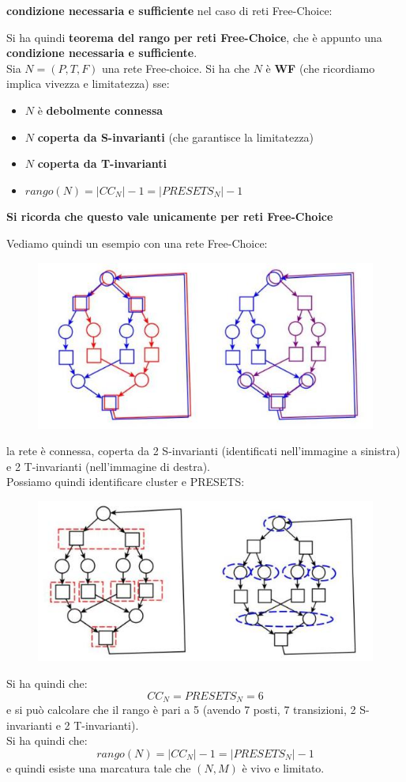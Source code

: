 \documentclass[a4paper,12pt, oneside]{book}
\begin{document}
\textbf{condizione necessaria e sufficiente} nel caso di reti Free-Choice:
\begin{teorema}
  Si ha quindi \textbf{teorema del rango per reti Free-Choice}, che è appunto
  una \textbf{condizione necessaria e sufficiente}.\\
  Sia $N = (P, T , F )$ una rete Free-choice. Si ha che $N$ è \textbf{WF} (che
  ricordiamo implica vivezza e limitatezza) sse:
  \begin{itemize}
    \item $N$ è \textbf{debolmente connessa}
    \item $N$ \textbf{coperta da S-invarianti} (che garantisce la limitatezza)
    \item $N$ \textbf{coperta da T-invarianti}
    \item $rango(N)=|CC_N|-1=|PRESETS_N|-1$
  \end{itemize}
  \textbf{Si ricorda che questo vale unicamente per reti Free-Choice}
\end{teorema}
\begin{esempio}
  Vediamo quindi un esempio con una rete Free-Choice:
  \begin{figure}[H]
    \centering
    \includegraphics[scale = 0.65]{img/cc10.jpg}
  \end{figure}
  la rete è connessa, coperta da 2 S-invarianti (identificati nell'immagine a
  sinistra) e 2 T-invarianti (nell'immagine di destra).\\
  \newpage
  Possiamo quindi identificare cluster e PRESETS:
  \begin{figure}[H]
    \centering
    \includegraphics[scale = 0.65]{img/cc9.jpg}
  \end{figure}
  Si ha quindi che:
  \[CC_N=PRESETS_N=6\]
  e si può calcolare che il rango è pari a 5 (avendo 7 posti, 7 transizioni, 2
  S-invarianti e 2 T-invarianti).\\
  Si ha quindi che:
  \[rango(N)=|CC_N|-1=|PRESETS_N|-1\]
  e quindi esiste una marcatura tale che $(N, M)$ è vivo e limitato.
\end{esempio}
\end{document}
